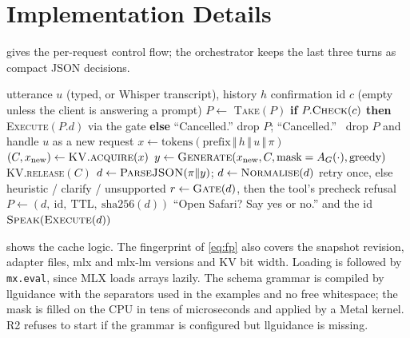 \documentclass[journal]{IEEEtran}
\theoremstyle{definition}
\begin{document}



\appendices
{}

\section{Implementation Details}\label{app:impl}

 gives the per-request control flow; the orchestrator keeps the last three turns
as compact JSON decisions.

\begin{algorithm}[t]
\caption{Handling one request in R2}\label{alg:request}
\small
\begin{algorithmic}[1]
\Require utterance $u$ (typed, or Whisper transcript), history $h$
\Require confirmation id $c$ (empty unless the client is answering a prompt)
   \State $P\gets$ \textsc{Take}$(P)$ 
    \State \textbf{if} $P.\textsc{Check}(c)$ \textbf{then} \Return \textsc{Execute}$(P.d)$ via the gate
    \State \textbf{else} \Return ``Cancelled.'' 
   \State drop $P$; \Return ``Cancelled.''
  \Else\ drop $P$ and handle $u$ as a new request
  \EndIf
\EndIf
\State $x \gets \mathrm{tokens}(\text{prefix}\,\Vert\,h\,\Vert\,u\,\Vert\,\pi)$
\State $(C, x_{\text{new}}) \gets \textsc{KV.acquire}(x)$ 
\State $y \gets \textsc{Generate}(x_{\text{new}}, C, \text{mask}=A_G(\cdot), \text{greedy})$
\State \textsc{KV.release}$(C)$ 
\State $d \gets \textsc{ParseJSON}(\pi\Vert y)$; $d\gets\textsc{Normalise}(d)$ 
 \State retry once, else heuristic / clarify / unsupported \EndIf
\State $r \gets \textsc{Gate}(d)$, then the tool's precheck 
 \Return refusal
 \State $P\gets(d,\ \text{id},\ \text{TTL},\ \mathrm{sha256}(d))$
  \State \Return ``Open Safari? Say yes or no.'' and the id
\Else\ \Return $\textsc{Speak}(\textsc{Execute}(d))$
\EndIf
\end{algorithmic}
\end{algorithm}

 shows the cache logic. The fingerprint of \cref{eq:fp} also covers the snapshot
revision, adapter files, mlx and mlx-lm versions and KV bit width. Loading is followed by
\texttt{mx.eval}, since MLX loads arrays lazily. The schema grammar is compiled by llguidance with
the separators used in the examples and no free whitespace; the mask is filled on the CPU in tens of
microseconds and applied by a Metal kernel. R2 refuses to start if the grammar is configured but
llguidance is missing.
\end{document}
